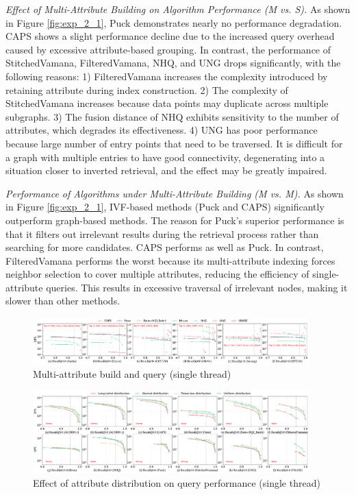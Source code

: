 \documentclass[sigconf, nonacm]{acmart}
\begin{document}
	\textit{Effect of Multi-Attribute Building on Algorithm Performance (M vs. S).}
	As shown in Figure \ref{fig:exp_2_1}, Puck demonstrates nearly no performance degradation.  CAPS shows a slight performance decline due to the increased query overhead caused by excessive attribute-based grouping. In contrast, the performance of StitchedVamana, FilteredVamana, NHQ, and UNG drops significantly, with the following reasons: 1) FilteredVamana increases the complexity introduced by retaining attribute during index construction. 2) The complexity of StitchedVamana increases because data points may duplicate across multiple subgraphs. 3) The fusion distance of NHQ exhibits sensitivity to the number of attributes, which degrades its effectiveness. 4) UNG has poor performance because large number of entry points that need to be traversed. It is difficult for a graph with multiple entries to have good connectivity, degenerating into a situation closer to inverted retrieval, and the effect may be greatly impaired.
	
	
	
	\textit{Performance of Algorithms under Multi-Attribute Building (M vs. M).}  
	As shown in Figure \ref{fig:exp_2_1}, IVF-based methods (Puck and CAPS) significantly outperform graph-based methods. The reason for Puck's superior performance is that it filters out irrelevant results during the retrieval process rather than searching for more candidates. CAPS performs as well as Puck. In contrast, FilteredVamana performs the worst because its multi-attribute indexing forces neighbor selection to cover multiple attributes, reducing the efficiency of single-attribute queries. This results in excessive traversal of irrelevant nodes, making it slower than other methods.
	
	
	\begin{figure}
		\centering
		
		\includegraphics[width=0.95\textwidth]{figures/exp/exp_4_1_MultiLabel_1thread.pdf}
		\caption{Multi-attribute build and query (single thread)}
		\label{fig:exp_4_1_MultiLabel_1thread}
	\end{figure}
	
	\begin{figure}
		\centering
		
		\includegraphics[width=0.95\textwidth]{figures/exp/exp_3_1.pdf}
		\caption{Effect of attribute distribution on query performance (single thread)}
		\label{fig:exp_3_1}
	\end{figure}
	
\end{document}
